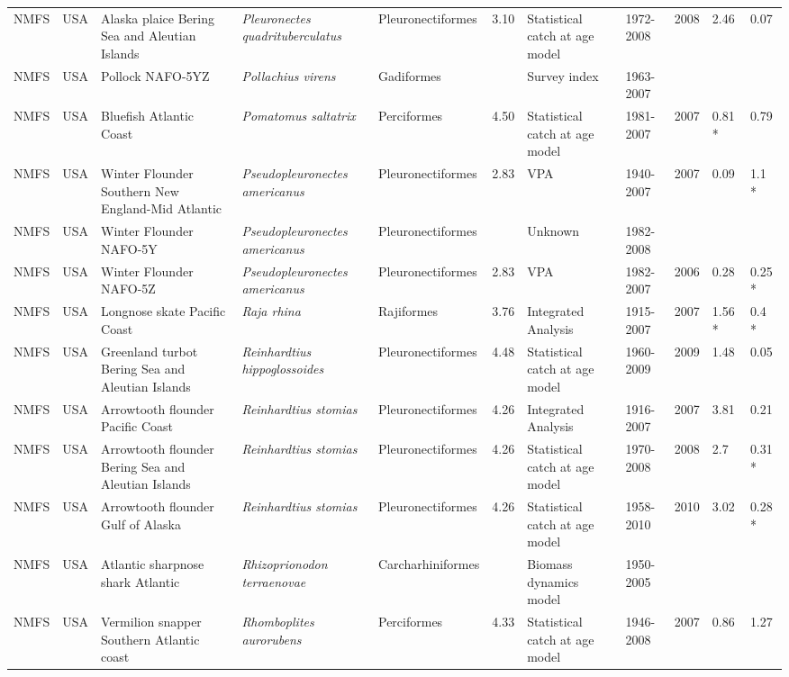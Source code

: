 \begin{longtable}{p{1.5cm}p{1.5cm}p{3cm}p{3cm}p{2.5cm}p{0.9cm}p{1.4cm}p{0.9cm}p{0.9cm}p{0.9cm}p{1cm}}
  NMFS & USA & Alaska plaice Bering Sea and Aleutian Islands & \textit{Pleuronectes quadrituberculatus} & Pleuronectiformes & 3.10 & Statistical catch at age model & 1972-2008 & 2008 & 2.46 & 0.07 \\ 
  NMFS & USA & Pollock NAFO-5YZ & \textit{Pollachius virens} & Gadiformes &  & Survey index & 1963-2007 &  &  &  \\ 
  NMFS & USA & Bluefish Atlantic Coast & \textit{Pomatomus saltatrix} & Perciformes & 4.50 & Statistical catch at age model & 1981-2007 & 2007 & 0.81 * & 0.79 \\ 
  NMFS & USA & Winter Flounder Southern New England-Mid Atlantic & \textit{Pseudopleuronectes americanus} & Pleuronectiformes & 2.83 & VPA & 1940-2007 & 2007 & 0.09 & 1.1 * \\ 
  NMFS & USA & Winter Flounder NAFO-5Y & \textit{Pseudopleuronectes americanus} & Pleuronectiformes &  & Unknown & 1982-2008 &  &  &  \\ 
  NMFS & USA & Winter Flounder NAFO-5Z & \textit{Pseudopleuronectes americanus} & Pleuronectiformes & 2.83 & VPA & 1982-2007 & 2006 & 0.28 & 0.25 * \\ 
  NMFS & USA & Longnose skate Pacific Coast & \textit{Raja rhina} & Rajiformes & 3.76 & Integrated Analysis & 1915-2007 & 2007 & 1.56 * & 0.4 * \\ 
  NMFS & USA & Greenland turbot Bering Sea and Aleutian Islands & \textit{Reinhardtius hippoglossoides} & Pleuronectiformes & 4.48 & Statistical catch at age model & 1960-2009 & 2009 & 1.48 & 0.05 \\ 
  NMFS & USA & Arrowtooth flounder Pacific Coast & \textit{Reinhardtius stomias} & Pleuronectiformes & 4.26 & Integrated Analysis & 1916-2007 & 2007 & 3.81 & 0.21 \\ 
  NMFS & USA & Arrowtooth flounder Bering Sea and Aleutian Islands & \textit{Reinhardtius stomias} & Pleuronectiformes & 4.26 & Statistical catch at age model & 1970-2008 & 2008 & 2.7 & 0.31 * \\ 
  NMFS & USA & Arrowtooth flounder Gulf of Alaska & \textit{Reinhardtius stomias} & Pleuronectiformes & 4.26 & Statistical catch at age model & 1958-2010 & 2010 & 3.02 & 0.28 * \\ 
  NMFS & USA & Atlantic sharpnose shark Atlantic & \textit{Rhizoprionodon terraenovae} & Carcharhiniformes &  & Biomass dynamics model & 1950-2005 &  &  &  \\ 
  NMFS & USA & Vermilion snapper Southern Atlantic coast & \textit{Rhomboplites aurorubens} & Perciformes & 4.33 & Statistical catch at age model & 1946-2008 & 2007 & 0.86 & 1.27 \\ 

\end{longtable}
